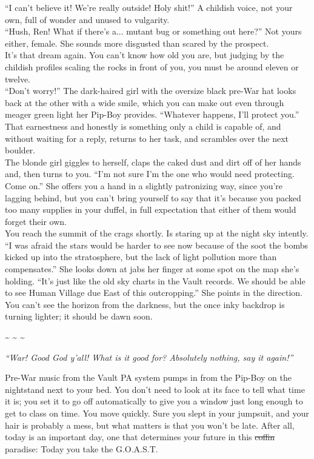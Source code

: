 \documentclass[a4paper,12pt]{book}
\begin{document}
``I can't believe it! We're really outside! Holy shit!'' A childish voice, not your own, full of wonder and unused to vulgarity.\\
``Hush, Ren! What if there's a... mutant bug or something out here?'' Not yours either, female. She sounds more disgusted than scared by the prospect.\\
It's that dream again. You can't know how old you are, but judging by the childish profiles scaling the rocks in front of you, you must be around eleven or twelve.\\
``Don't worry!'' The dark-haired girl with the oversize black pre-War hat looks back at the other with a wide smile, which you can make out even through meager green light her Pip-Boy provides. ``Whatever happens, I'll protect you.'' That earnestness and honestly is something only a child is capable of, and without waiting for a reply, returns to her task, and scrambles over the next boulder.\\
The blonde girl giggles to herself, claps the caked dust and dirt off of her hands and, then turns to you. ``I'm not sure I'm the one who would need protecting. Come on.'' She offers you a hand in a slightly patronizing way, since you're lagging behind, but you can't bring yourself to say that it's because you packed too many supplies in your duffel, in full expectation that either of them would forget their own.\\
You reach the summit of the crags shortly. Is staring up at the night sky intently. ``I was afraid the stars would be harder to see now because of the soot the bombs kicked up into the stratosphere, but the lack of light pollution more than compensates.'' She looks down at jabs her finger at some spot on the map she's holding. ``It's just like the old sky charts in the Vault records. We should be able to see Human Village due East of this outcropping.'' She points in the direction. You can't see the horizon from the darkness, but the once inky backdrop is turning lighter; it should be dawn soon.

\begin{center}
\~{} \~{} \~{}
\end{center}

\emph{``War! Good God y'all! What is it good for? Absolutely nothing, say it again!''}

Pre-War music from the Vault PA system pumps in from the Pip-Boy on the nightstand next to your bed. You don't need to look at its face to tell what time it is; you set it to go off automatically to give you a window just long enough to get to class on time. You move quickly. Sure you slept in your jumpsuit, and your hair is probably a mess, but what matters is that you won't be late. After all, today is an important day, one that determines your future in this \st{coffin} paradise: Today you take the G.O.A.S.T.
\end{document}
